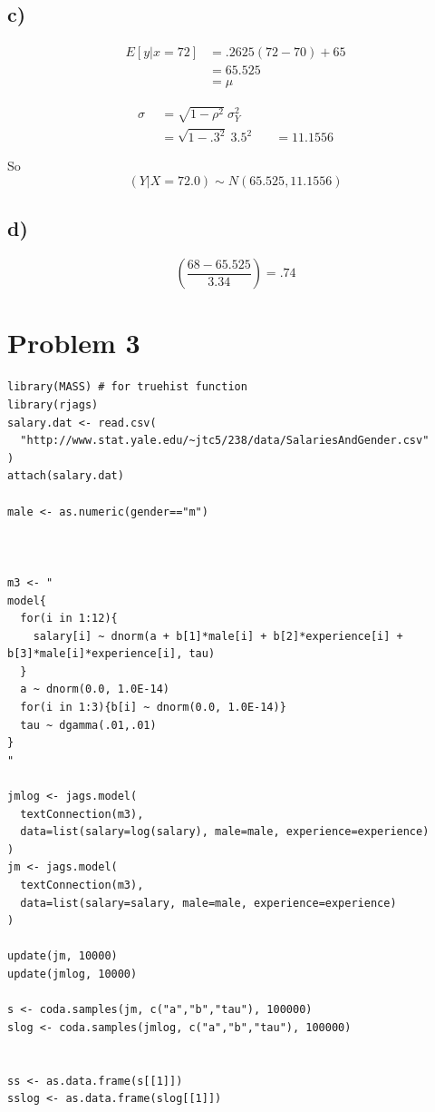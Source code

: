 \documentclass[11pt]{article}
\begin{document}
\subsection*{c)}
\label{sec:org415b827}
\begin{align*}
  E \left[ y | x = 72 \right]

  &= .2625\left( 72 - 70 \right) + 65\\

  &= 65.525\\

  &= \mu
                               
\end{align*}


\begin{align*}

  \sigma
  &= \sqrt{1 - \rho^{2}} \  \sigma^{2}_{Y}\\

  \quad &= \sqrt{1 -.3^{2}} \  3.5^{2}

  \quad &= 11.1556 
                               
\end{align*}

So $$(Y |X = 72.0) \sim N(65.525, 11.1556)$$

\subsection*{d)}
\label{sec:org4de1921}
$$ \left( \frac{68 - 65.525}{3.34}\right) = .74$$

\section*{Problem 3}
\label{sec:orgeefd5e0}
\begin{verbatim}
library(MASS) # for truehist function
library(rjags)
salary.dat <- read.csv(
  "http://www.stat.yale.edu/~jtc5/238/data/SalariesAndGender.csv"
)
attach(salary.dat)

male <- as.numeric(gender=="m")



m3 <- "
model{
  for(i in 1:12){
    salary[i] ~ dnorm(a + b[1]*male[i] + b[2]*experience[i] + b[3]*male[i]*experience[i], tau)
  }
  a ~ dnorm(0.0, 1.0E-14)
  for(i in 1:3){b[i] ~ dnorm(0.0, 1.0E-14)}
  tau ~ dgamma(.01,.01)
}
"

jmlog <- jags.model(
  textConnection(m3),
  data=list(salary=log(salary), male=male, experience=experience)
)
jm <- jags.model(
  textConnection(m3),
  data=list(salary=salary, male=male, experience=experience)
)

update(jm, 10000)
update(jmlog, 10000)

s <- coda.samples(jm, c("a","b","tau"), 100000)
slog <- coda.samples(jmlog, c("a","b","tau"), 100000)


ss <- as.data.frame(s[[1]])
sslog <- as.data.frame(slog[[1]])

\end{verbatim}
\end{document}
